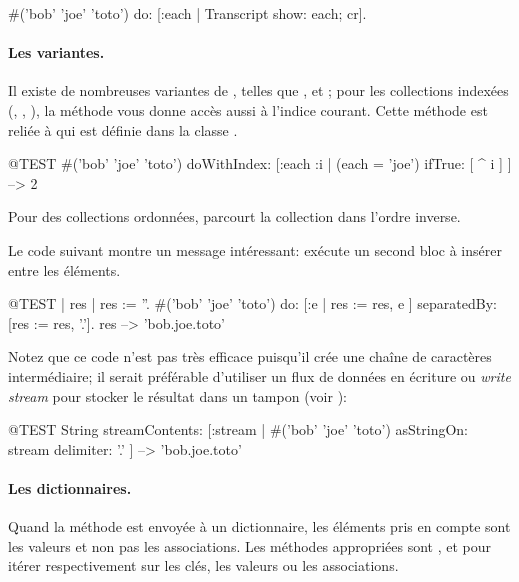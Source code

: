 \documentclass[a4paper,10pt,twoside]{book}
\begin{document}
\begin{code}{}
#('bob' 'joe' 'toto') do: [:each | Transcript show: each; cr].
\end{code}

\paragraph{Les variantes.} Il existe de nombreuses variantes de , 
telles que \mbox{,} 
\mbox{} 
et ;
pour les collections indexées (, , ), la méthode  
vous donne accès aussi à l'indice courant.
Cette méthode est reliée à  qui est définie dans la classe
.

\begin{code}{@TEST}
#('bob' 'joe' 'toto') doWithIndex: [:each :i | (each = 'joe') ifTrue: [ ^ i ] ] --> 2
\end{code}

Pour des collections ordonnées,  parcourt la collection dans l'ordre inverse.

Le code suivant montre un message intéressant:
 exécute un second bloc 
à insérer entre les éléments.
\begin{code}{@TEST | res | }
res := ''.
#('bob' 'joe' 'toto') do: [:e | res := res, e ] separatedBy: [res := res, '.'].
res --> 'bob.joe.toto'
\end{code}
\noindent
Notez que ce code n'est pas très efficace puisqu'il crée une chaîne
de caractères intermédiaire; il serait préférable d'utiliser
un flux de données en écriture ou \emph{write stream} pour stocker
le résultat dans un tampon (voir ):
\begin{code}{@TEST}
String streamContents: [:stream | #('bob' 'joe' 'toto') asStringOn: stream delimiter: '.' ] --> 'bob.joe.toto'
\end{code}



\paragraph{Les dictionnaires.}
Quand la méthode  est envoyée à un dictionnaire,
les éléments pris en compte sont les valeurs et non pas les associations.
Les méthodes appropriées sont ,  et  pour itérer respectivement sur les clés, les valeurs ou les associations.
\end{document}

